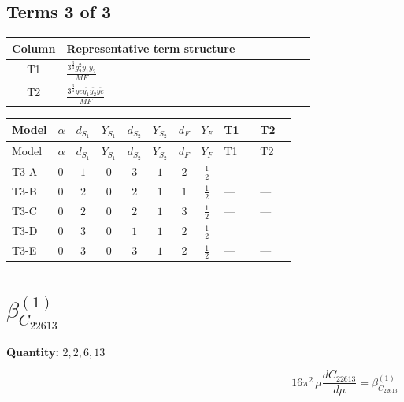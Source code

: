 \documentclass[8pt]{article}
\begin{document}
\begin{landscape}
\subsection*{Terms 3 of 3}
\begin{center}
\begin{tabular}{@{}c >{\raggedright\arraybackslash}p{0.82\linewidth}@{}}
\toprule
Column & Representative term structure \\
\midrule
T1 & \(\displaystyle \frac{3^{\frac{3}{4}} g_{2}^{2} \overline{y_{1}} \overline{y_{2}}}{MF}\) \\
\midrule
T2 & \(\displaystyle \frac{3^{\frac{3}{4}} ye \overline{y_{1}} \overline{y_{2}} \overline{ye}}{MF}\) \\
\midrule
\bottomrule
\end{tabular}
\end{center}
\smallskip
\tiny
\begin{longtable}{@{}llcccccc >{\raggedright\arraybackslash}p{0.21\linewidth} >{\raggedright\arraybackslash}p{0.21\linewidth}@{}}
\toprule
Model & $\alpha$ & $d_{S_1}$ & $Y_{S_1}$ & $d_{S_2}$ & $Y_{S_2}$ & $d_F$ & $Y_F$ & T1 & T2 \\
\midrule
\endfirsthead
\toprule
Model & $\alpha$ & $d_{S_1}$ & $Y_{S_1}$ & $d_{S_2}$ & $Y_{S_2}$ & $d_F$ & $Y_F$ & T1 & T2 \\
\midrule
\endhead
T3-A & $0$ & $1$ & $0$ & $3$ & $1$ & $2$ & $\frac{1}{2}$ & --- & --- \\
\midrule
T3-B & $0$ & $2$ & $0$ & $2$ & $1$ & $1$ & $\frac{1}{2}$ & --- & --- \\
\midrule
T3-C & $0$ & $2$ & $0$ & $2$ & $1$ & $3$ & $\frac{1}{2}$ & --- & --- \\
\midrule
T3-D & $0$ & $3$ & $0$ & $1$ & $1$ & $2$ & $\frac{1}{2}$ & \scriptsize\adjustbox{max width=\linewidth}{$\begin{gathered} \frac{11 \cdot 3^{\frac{3}{4}} g_{2}^{2} \overline{y_{1}} \overline{y_{2}}}{8 MF}\end{gathered}$} & \scriptsize\adjustbox{max width=\linewidth}{$\begin{gathered} - \frac{3^{\frac{3}{4}} ye \overline{y_{1}} \overline{y_{2}} \overline{ye}}{12 MF}\end{gathered}$} \\
\midrule
T3-E & $0$ & $3$ & $0$ & $3$ & $1$ & $2$ & $\frac{1}{2}$ & --- & --- \\
\midrule
\bottomrule
\end{longtable}
\clearpage
\section*{$\beta_{C_{22613}}^{(1)}$}
\noindent\textbf{Quantity: }$\mathrm{2,2,6,13}$\par\smallskip
\[16\pi^2\,\mu\frac{d C_{22613}}{d\mu}=\beta_{C_{22613}}^{(1)}\]

\end{landscape}
\end{document}
